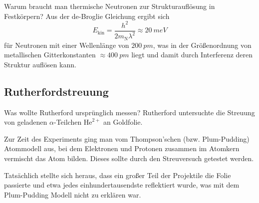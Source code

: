
\begin{fquestion}{Warum braucht man thermische Neutronen zur Strukturauflösung in Festkörpern?}
    Aus der de-Broglie Gleichung ergibt sich 
    $$E_{\mathrm{kin}} = \frac{h^2}{2 m_{\mathrm{N}} \lambda^2} \approx \SI{20}{meV}$$
    für Neutronen mit einer Wellenlänge von $\SI{200}{pm}$, was in der Größenordnung von metallischen Gitterkonstanten $\approx \SI{400}{pm}$ liegt und damit durch Interferenz deren Struktur auflösen kann. 
\end{fquestion}




\subsection{Rutherfordstreuung}

\begin{fquestion}{Was wollte Rutherford ursprünglich messen?}
    Rutherford untersuchte die Streuung von geladenen $\alpha$-Teilchen $\mathrm{He}^{2+}$ an Goldfolie.
    
    Zur Zeit des Experiments ging man vom Thompson'schen (bzw. Plum-Pudding) Atommodell aus, bei dem Elektronen und Protonen zusammen im Atomkern vermischt das Atom bilden.
    Dieses sollte durch den Streuversuch getestet werden.
    
    Tatsächlich stellte sich heraus, dass ein großer Teil der Projektile die Folie passierte und etwa jedes einhundertausendste reflektiert wurde, was mit dem Plum-Pudding Modell nicht zu erklären war.
\end{fquestion}

